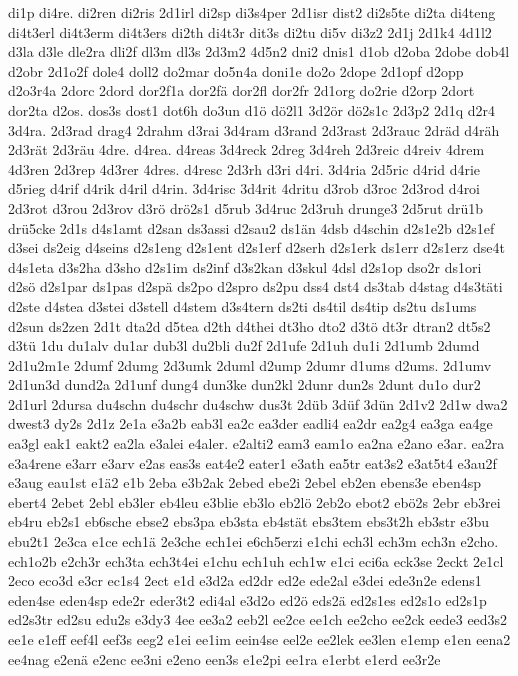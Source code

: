 {di1p
di4re.
di2ren
di2ris
2d1irl
di2sp
di3s4per
2d1isr
dist2
di2s5te
di2ta
di4teng
di4t3erl
di4t3erm
di4t3ers
di2th
di4t3r
dit3s
di2tu
di5v
di3z2
2d1j
2d1k4
4d1l2
d3la
d3le
dle2ra
dli2f
dl3m
dl3s
2d3m2
4d5n2
dni2
dnis1
d1ob
d2oba
2dobe
dob4l
d2obr
2d1o2f
dole4
doll2
do2mar
do5n4a
doni1e
do2o
2dope
2d1opf
d2opp
d2o3r4a
2dorc
2dord
dor2f1a
dor2fä
dor2fl
dor2fr
2d1org
do2rie
d2orp
2dort
dor2ta
d2os.
dos3s
dost1
dot6h
do3un
d1ö
dö2l1
3d2ör
dö2s1c
2d3p2
2d1q
d2r4
3d4ra.
2d3rad
drag4
2drahm
d3rai
3d4ram
d3rand
2d3rast
2d3rauc
2dräd
d4räh
2d3rät
2d3räu
4dre.
d4rea.
d4reas
3d4reck
2dreg
3d4reh
2d3reic
d4reiv
4drem
4d3ren
2d3rep
4d3rer
4dres.
d4resc
2d3rh
d3ri
d4ri.
3d4ria
2d5ric
d4rid
d4rie
d5rieg
d4rif
d4rik
d4ril
d4rin.
3d4risc
3d4rit
4dritu
d3rob
d3roc
2d3rod
d4roi
2d3rot
d3rou
2d3rov
d3rö
drö2s1
d5rub
3d4ruc
2d3ruh
drunge3
2d5rut
drü1b
drü5cke
2d1s
d4s1amt
d2san
ds3assi
d2sau2
ds1än
4dsb
d4schin
d2s1e2b
d2s1ef
d3sei
ds2eig
d4seins
d2s1eng
d2s1ent
d2s1erf
d2serh
d2s1erk
ds1err
d2s1erz
dse4t
d4s1eta
d3s2ha
d3sho
d2s1im
ds2inf
d3s2kan
d3skul
4dsl
d2s1op
dso2r
ds1ori
d2sö
d2s1par
ds1pas
d2spä
ds2po
d2spro
ds2pu
dss4
dst4
ds3tab
d4stag
d4s3täti
d2ste
d4stea
d3stei
d3stell
d4stem
d3s4tern
ds2ti
ds4til
ds4tip
ds2tu
ds1ums
d2sun
ds2zen
2d1t
dta2d
d5tea
d2th
d4thei
dt3ho
dto2
d3tö
dt3r
dtran2
dt5s2
d3tü
1du
du1alv
du1ar
dub3l
du2bli
du2f
2d1ufe
2d1uh
du1i
2d1umb
2dumd
2d1u2m1e
2dumf
2dumg
2d3umk
2duml
d2ump
2dumr
d1ums
d2ums.
2d1umv
2d1un3d
dund2a
2d1unf
dung4
dun3ke
dun2kl
2dunr
dun2s
2dunt
du1o
dur2
2d1url
2dursa
du4schn
du4schr
du4schw
dus3t
2düb
3düf
3dün
2d1v2
2d1w
dwa2
dwest3
dy2s
2d1z
2e1a
e3a2b
eab3l
ea2c
ea3der
eadli4
ea2dr
ea2g4
ea3ga
ea4ge
ea3gl
eak1
eakt2
ea2la
e3alei
e4aler.
e2alti2
eam3
eam1o
ea2na
e2ano
e3ar.
ea2ra
e3a4rene
e3arr
e3arv
e2as
eas3s
eat4e2
eater1
e3ath
ea5tr
eat3s2
e3at5t4
e3au2f
e3aug
eau1st
e1ä2
e1b
2eba
e3b2ak
2ebed
ebe2i
2ebel
eb2en
ebens3e
eben4sp
ebert4
2ebet
2ebl
eb3ler
eb4leu
e3blie
eb3lo
eb2lö
2eb2o
ebot2
ebö2s
2ebr
eb3rei
eb4ru
eb2s1
eb6sche
ebse2
ebs3pa
eb3sta
eb4stät
ebs3tem
ebs3t2h
eb3str
e3bu
ebu2t1
2e3ca
e1ce
ech1ä
2e3che
ech1ei
e6ch5erzi
e1chi
ech3l
ech3m
ech3n
e2cho.
ech1o2b
e2ch3r
ech3ta
ech3t4ei
e1chu
ech1uh
ech1w
e1ci
eci6a
eck3se
2eckt
2e1cl
2eco
eco3d
e3cr
ec1s4
2ect
e1d
e3d2a
ed2dr
ed2e
ede2al
e3dei
ede3n2e
edens1
eden4se
eden4sp
ede2r
eder3t2
edi4al
e3d2o
ed2ö
eds2ä
ed2s1es
ed2s1o
ed2s1p
ed2s3tr
ed2su
edu2s
e3dy3
4ee
ee3a2
eeb2l
ee2ce
ee1ch
ee2cho
ee2ck
eede3
eed3s2
ee1e
e1eff
eef4l
eef3s
eeg2
e1ei
ee1im
eein4se
eel2e
ee2lek
ee3len
e1emp
e1en
eena2
ee4nag
e2enä
e2enc
ee3ni
e2eno
een3s
e1e2pi
ee1ra
e1erbt
e1erd
ee3r2e
}
